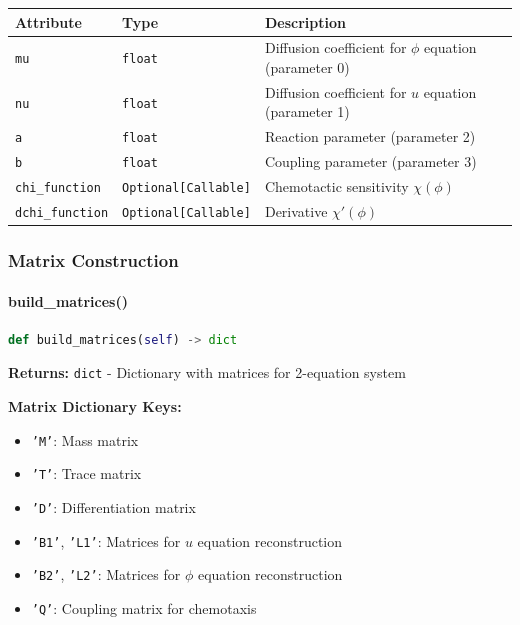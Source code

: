 \begin{longtable}{|p{3.2cm}|p{3.5cm}|p{7cm}|}
\hline
\textbf{Attribute} & \textbf{Type} & \textbf{Description} \\
\hline
\endhead

\texttt{mu} & \texttt{float} & Diffusion coefficient for $\phi$ equation (parameter 0) \\
\hline

\texttt{nu} & \texttt{float} & Diffusion coefficient for $u$ equation (parameter 1) \\
\hline

\texttt{a} & \texttt{float} & Reaction parameter (parameter 2) \\
\hline

\texttt{b} & \texttt{float} & Coupling parameter (parameter 3) \\
\hline

\texttt{chi\_function} & \texttt{Optional[Callable]} & Chemotactic sensitivity $\chi(\phi)$ \\
\hline

\texttt{dchi\_function} & \texttt{Optional[Callable]} & Derivative $\chi'(\phi)$ \\
\hline

\end{longtable}

\subsubsection{Matrix Construction}

\paragraph{build\_matrices()}\leavevmode
\begin{lstlisting}[language=Python, caption=KellerSegel Build Matrices]
def build_matrices(self) -> dict
\end{lstlisting}

\textbf{Returns:} \texttt{dict} - Dictionary with matrices for 2-equation system

\textbf{Matrix Dictionary Keys:}
\begin{itemize}
    \item \texttt{'M'}: Mass matrix
    \item \texttt{'T'}: Trace matrix  
    \item \texttt{'D'}: Differentiation matrix
    \item \texttt{'B1'}, \texttt{'L1'}: Matrices for $u$ equation reconstruction
    \item \texttt{'B2'}, \texttt{'L2'}: Matrices for $\phi$ equation reconstruction
    \item \texttt{'Q'}: Coupling matrix for chemotaxis
\end{itemize}

